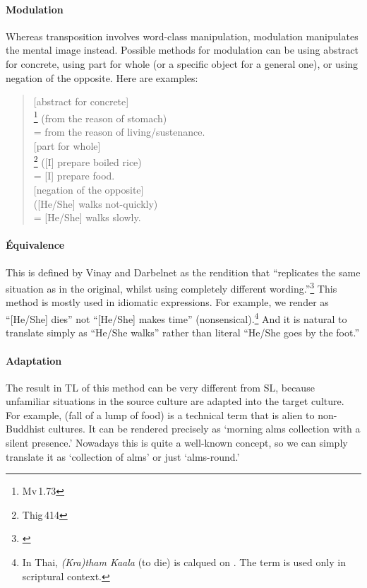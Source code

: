 \paragraph*{Modulation} Whereas transposition involves word-class manipulation, modulation manipulates the mental image instead. Possible methods for modulation can be using abstract for concrete, using part for whole (or a specific object for a general one), or using negation of the opposite. Here are examples:

\begin{quote}
[abstract for concrete]\\
\footnote{Mv\,1.73} (from the reason of stomach)\\
= from the reason of living/sustenance.\\[1.5mm]
[part for whole]\\
\footnote{Thig\,414} ([I] prepare boiled rice)\\
= [I] prepare food.\\[1.5mm]
[negation of the opposite]\\
 ([He/She] walks not-quickly)\\
= [He/She] walks slowly.\\[1.5mm]
\end{quote}

\paragraph*{\'Equivalence} This is defined by Vinay and Darbelnet as the rendition that ``replicates the same situation as in the original, whilst using completely different wording.''\footnote{\citealp[p.~342]{vinaydarbelnet:comparative}} This method is mostly used in idiomatic expressions. For example, we render  as ``[He/She] dies'' not ``[He/She] makes time'' (nonsensical).\footnote{In Thai, \textit{(Kra)tham Kaala} (to die) is calqued on . The term is used only in scriptural context.} And it is natural to translate  simply as ``He/She walks'' rather than literal ``He/She goes by the foot.''

\paragraph*{Adaptation} The result in TL of this method can be very different from SL, because unfamiliar situations in the source culture are adapted into the target culture. For example,  (fall of a lump of food) is a technical term that is alien to non-Buddhist cultures. It can be rendered precisely as `morning alms collection with a silent presence.' Nowadays this is quite a well-known concept, so we can simply translate it as `collection of alms' or just `alms-round.'

